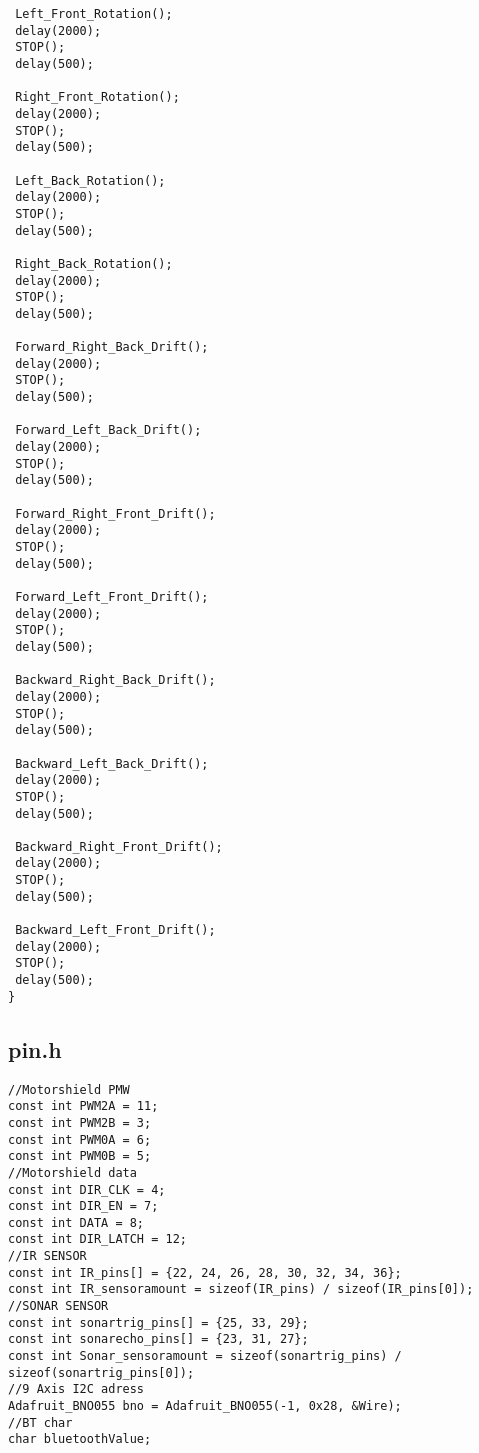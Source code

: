 \begin{lstlisting}
 Left_Front_Rotation();
 delay(2000);
 STOP();
 delay(500);

 Right_Front_Rotation();
 delay(2000);
 STOP();
 delay(500);

 Left_Back_Rotation();
 delay(2000);
 STOP();
 delay(500);

 Right_Back_Rotation();
 delay(2000);
 STOP();
 delay(500);

 Forward_Right_Back_Drift();
 delay(2000);
 STOP();
 delay(500);

 Forward_Left_Back_Drift();
 delay(2000);
 STOP();
 delay(500);

 Forward_Right_Front_Drift();
 delay(2000);
 STOP();
 delay(500);
 
 Forward_Left_Front_Drift();
 delay(2000);
 STOP();
 delay(500);

 Backward_Right_Back_Drift();
 delay(2000);
 STOP();
 delay(500);

 Backward_Left_Back_Drift();
 delay(2000);
 STOP();
 delay(500);

 Backward_Right_Front_Drift();
 delay(2000);
 STOP();
 delay(500);

 Backward_Left_Front_Drift();
 delay(2000);
 STOP();
 delay(500);
}
\end{lstlisting}
\subsection{pin.h}
\begin{lstlisting}
//Motorshield PMW
const int PWM2A = 11;
const int PWM2B = 3;
const int PWM0A = 6;
const int PWM0B = 5;
//Motorshield data
const int DIR_CLK = 4;
const int DIR_EN = 7;
const int DATA = 8;
const int DIR_LATCH = 12;
//IR SENSOR
const int IR_pins[] = {22, 24, 26, 28, 30, 32, 34, 36};
const int IR_sensoramount = sizeof(IR_pins) / sizeof(IR_pins[0]);
//SONAR SENSOR
const int sonartrig_pins[] = {25, 33, 29};
const int sonarecho_pins[] = {23, 31, 27};
const int Sonar_sensoramount = sizeof(sonartrig_pins) / sizeof(sonartrig_pins[0]);
//9 Axis I2C adress
Adafruit_BNO055 bno = Adafruit_BNO055(-1, 0x28, &Wire);
//BT char
char bluetoothValue;
\end{lstlisting}
